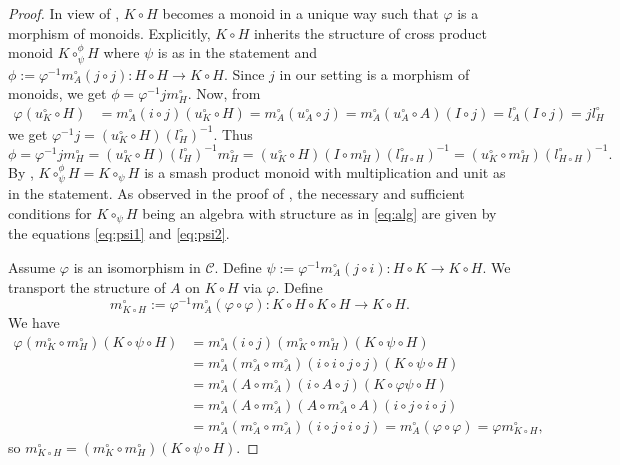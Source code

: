 \documentclass[nosumlimits,twoside]{amsart}
\theoremstyle{definition}
\theoremstyle{remark}
\newenvironment{invisible}{{\noindent\sc \colorbox{yellow}{Invisible:}\;}\color{gray}}{\medskip}
\begin{document}
\begin{proof}
In view of \cite[Proposition 2.3]{BD-CrossII}, $K\circ H$ becomes a monoid in a unique way such that $\varphi$ is a morphism of monoids. Explicitly, $K\circ H$
inherits the structure of cross product monoid $K\circ_{\psi}^\phi H$ where $\psi$ is as in the statement and
$\phi:=\varphi^{-1} m_A^\circ(j\circ j):H\circ H \to K\circ H.$ Since $j$ in our setting is a morphism of monoids, we get $\phi=\varphi^{-1}j m_H^\circ$. Now, from
\[
\begin{split}
 \varphi(u_{K}^{\circ}\circ H)&=m_{A}^{\circ}(i\circ j)(u_{K}^{\circ}\circ H)=m_{A}^{\circ}(u_{A}^{\circ}\circ j)=m_{A}^{\circ}(u_{A}^{\circ}\circ A)(I\circ j)=l_{A}^{\circ}(I\circ j)=j l_{H}^{\circ}
\end{split}
\]
we get 
$\varphi^{-1}j=(u^\circ_K\circ H)(l_{H}^{\circ})^{-1}$.
Thus
\[\phi=\varphi^{-1}j m_H^\circ{=}(u^\circ_K\circ H)(l_{H}^{\circ})^{-1}m_H^\circ
=(u^\circ_K\circ H)(I\circ m_H^\circ)(l_{H\circ H}^{\circ})^{-1}
=(u^\circ_K\circ m_H^\circ)(l_{H\circ H}^{\circ})^{-1}.\]
By  \cite[Proposition 2.5]{BD-CrossII}, $K\circ_\psi^\phi H=K\circ_\psi H$ is a smash product monoid with multiplication and unit as in the statement. As observed in the proof of \cite[Proposition 2.6]{BD-CrossI}, the necessary and sufficient conditions
for $K\circ_\psi H$ being an algebra with structure as in \eqref{eq:alg} are given by the equations \eqref{eq:psi1} and \eqref{eq:psi2}.

\begin{invisible}
   Assume $\varphi$ is an isomorphism in $\mathcal{C}$. Define $\psi:=\varphi^{-1} m_A^\circ(j\circ i):H\circ K \to K\circ H$. We transport the structure of $A$ on $K\circ H$ via $\varphi$. Define
\[
m^\circ_{K\circ H}:=\varphi^{-1}m_A^\circ (\varphi\circ\varphi):K\circ H\circ K\circ H \to K\circ H.
\]
We have
\[
\begin{split}
\varphi(m^\circ_K\circ m_H^\circ)(K\circ\psi \circ H)&=m_A^\circ (i\circ j)(m^\circ_K\circ m^\circ_H)(K\circ\psi\circ H)
\\&=m_A^\circ(m_A^\circ\circ m_A^\circ )(i\circ i\circ j\circ j)(K\circ\psi\circ H)\\&=m_A^\circ (A\circ m_A^\circ)(i\circ A\circ j)(K\circ\varphi\psi\circ H)\\&=
m_A^\circ (A\circ m_A^\circ)(A\circ m_A^\circ \circ A)(i\circ j\circ i\circ j)\\&=m_A^\circ (m_A^\circ\circ m_A^\circ)(i\circ j\circ i\circ j)=m_A^\circ(\varphi\circ \varphi)=\varphi m^\circ_{K\circ H},
\end{split}
\]
so $m^\circ_{K\circ H}=(m^\circ_K\circ m^\circ_H)(K\circ\psi\circ H)$.


\end{invisible}
\end{proof}
\end{document}
